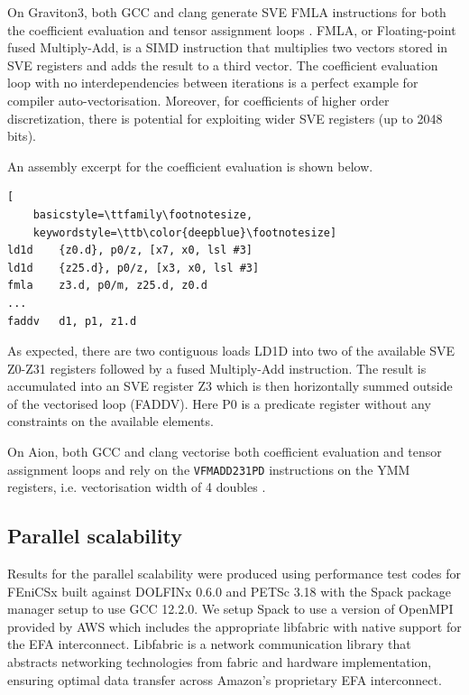 On Graviton3, both GCC and clang generate SVE FMLA instructions
\citep{ArmReferenceManual} for both the coefficient evaluation and tensor
assignment loops \citep{GodboltArmClang,GodboltArmGCC}. FMLA, or Floating-point
fused Multiply-Add, is a SIMD instruction that multiplies two vectors stored in
SVE registers and adds the result to a third vector. The coefficient evaluation
loop with no interdependencies between iterations is a perfect example for
compiler auto-vectorisation. Moreover, for coefficients of higher order
discretization, there is potential for exploiting wider SVE registers (up to
2048 bits).

An assembly excerpt for the coefficient evaluation is shown below.
\begin{lstlisting}[
    basicstyle=\ttfamily\footnotesize,
    keywordstyle=\ttb\color{deepblue}\footnotesize]
ld1d    {z0.d}, p0/z, [x7, x0, lsl #3]
ld1d    {z25.d}, p0/z, [x3, x0, lsl #3]
fmla    z3.d, p0/m, z25.d, z0.d
...
faddv   d1, p1, z1.d
\end{lstlisting}
As expected, there are two contiguous loads LD1D into two of the available SVE
Z0-Z31 registers followed by a fused Multiply-Add instruction. The result is
accumulated into an SVE register Z3 which is then horizontally summed outside
of the vectorised loop (FADDV). Here P0 is a predicate register without any
constraints on the available elements.

On Aion, both GCC and clang vectorise both coefficient evaluation and tensor
assignment loops and rely on the \lstinline{VFMADD231PD} instructions on the
YMM registers, i.e. vectorisation width of 4 doubles
\citep{Godboltx86Clang,Godboltx86GCC}.

\subsection*{Parallel scalability}

Results for the parallel scalability were produced using performance test codes
for FEniCSx \citep{Wells2023} built against DOLFINx 0.6.0 and PETSc 3.18
\citep{petsc} with the Spack package manager setup to use GCC 12.2.0. We setup
Spack to use a version of OpenMPI provided by AWS which includes the appropriate
libfabric with native support for the EFA interconnect. Libfabric is a network
communication library that abstracts networking technologies from fabric and
hardware implementation, ensuring optimal data transfer across Amazon's
proprietary EFA interconnect.

